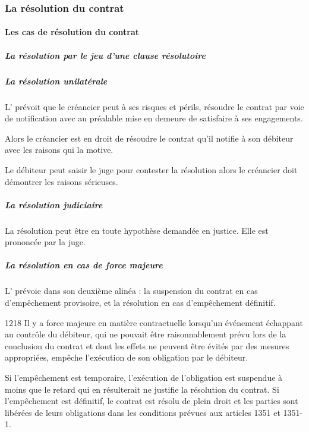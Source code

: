			\subsubsection{La résolution du contrat}\label{resolutionContrat}

				\paragraph{Les cas de résolution du contrat}

					\subparagraph{La résolution par le jeu d'une clause résolutoire}

					\subparagraph{La résolution unilatérale}

							L' prévoit que le créancier peut à ses risques et périls, résoudre le contrat par voie de notification avec au préalable mise en demeure de satisfaire à ses engagements.


							Alors le créancier est en droit de résoudre le contrat qu’il notifie à son débiteur avec les raisons qui la motive.


							Le débiteur peut saisir le juge pour contester la résolution alors le créancier doit démontrer les raisons sérieuses.


					\subparagraph{La résolution judiciaire}

							La résolution peut être en toute hypothèse demandée en justice. Elle est prononcée par la juge.

					\subparagraph{La résolution en cas de force majeure}

						L' prévoie dans son deuxième alinéa : la suspension du contrat en cas d'empêchement provisoire, et la résolution en cas d'empêchement définitif.

						\begin{citationArticleCciv}{1218}
							Il y a force majeure en matière contractuelle lorsqu'un événement échappant au contrôle du débiteur, qui ne pouvait être raisonnablement prévu lors de la conclusion du contrat et dont les effets ne peuvent être évités par des mesures appropriées, empêche l'exécution de son obligation par le débiteur.

							Si l'empêchement est temporaire, l'exécution de l'obligation est suspendue à moins que le retard qui en résulterait ne justifie la résolution du contrat. Si l'empêchement est définitif, le contrat est résolu de plein droit et les parties sont libérées de leurs obligations dans les conditions prévues aux articles 1351 et 1351-1.
						\end{citationArticleCciv}

